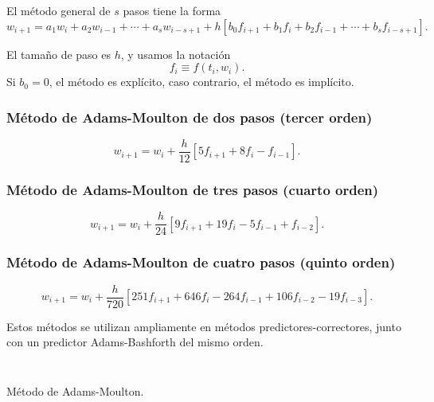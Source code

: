 El método general de $s$ pasos tiene la forma
\begin{equation*}
    w_{i+1}=
    a_{1}w_{i}+
    a_{2}w_{i−1}+\cdots+
    a_{s}w_{i-s+1}+
    h\left[
    b_{0}f_{i+1}+
    b_{1}f_{i}+
    b_{2}f_{i-1}+
    \cdots+
    b_{s}f_{i-s+1}\right].
\end{equation*}

El tamaño de paso es $h$, y usamos la notación
\begin{equation*}
    f_{i}\equiv
    f\left(t_{i},w_{i}\right).
\end{equation*}
Si $b_{0}=0$, el método es explícito, caso contrario, el método es
implícito.

\subsubsection{Método de Adams-Moulton de dos pasos (tercer orden)}

\begin{equation*}
    w_{i+1}=
    w_{i}+
    \frac{h}{12}\left[5f_{i+1}+8f_{i}-f_{i-1}\right].
\end{equation*}

\subsubsection{Método de Adams-Moulton de tres pasos (cuarto orden)}

\begin{equation*}
    w_{i+1}=
    w_{i}+
    \frac{h}{24}\left[9f_{i+1}+19f_{i}-5f_{i-1}+f_{i-2}\right].
\end{equation*}

\subsubsection{Método de Adams-Moulton de cuatro pasos (quinto orden)}

\begin{equation*}
    w_{i+1}=
    w_{i}+
    \frac{h}{720}\left[251f_{i+1}+646f_{i}-264f_{i-1}+106f_{i-2}-19f_{i-3}\right].
\end{equation*}

Estos métodos se utilizan ampliamente en métodos
predictores-correctores, junto con un predictor Adams-Bashforth del
mismo orden.

\begin{listing}[ht!]
    \tiny
    \centering
    \inputminted[linenos,highlightlines={8-31}]{octave}{predcorr.m}
    \inputminted[linenos,highlightlines={1-5}]{octave}{am1step.m}
    \caption{Método de Adams-Moulton.}
\end{listing}

